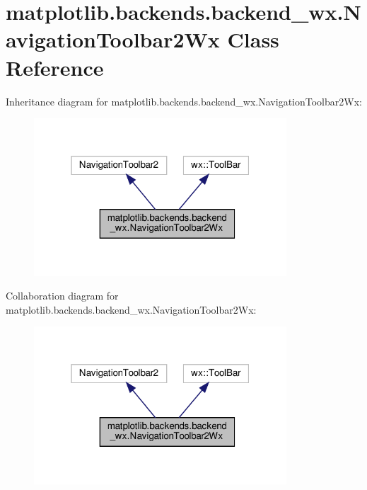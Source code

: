 \hypertarget{classmatplotlib_1_1backends_1_1backend__wx_1_1NavigationToolbar2Wx}{}\section{matplotlib.\+backends.\+backend\+\_\+wx.\+Navigation\+Toolbar2\+Wx Class Reference}
\label{classmatplotlib_1_1backends_1_1backend__wx_1_1NavigationToolbar2Wx}


Inheritance diagram for matplotlib.\+backends.\+backend\+\_\+wx.\+Navigation\+Toolbar2\+Wx\+:
\nopagebreak
\begin{figure}[H]
\begin{center}
\leavevmode
\includegraphics[width=268pt]{classmatplotlib_1_1backends_1_1backend__wx_1_1NavigationToolbar2Wx__inherit__graph}
\end{center}
\end{figure}


Collaboration diagram for matplotlib.\+backends.\+backend\+\_\+wx.\+Navigation\+Toolbar2\+Wx\+:
\nopagebreak
\begin{figure}[H]
\begin{center}
\leavevmode
\includegraphics[width=268pt]{classmatplotlib_1_1backends_1_1backend__wx_1_1NavigationToolbar2Wx__coll__graph}
\end{center}
\end{figure}
